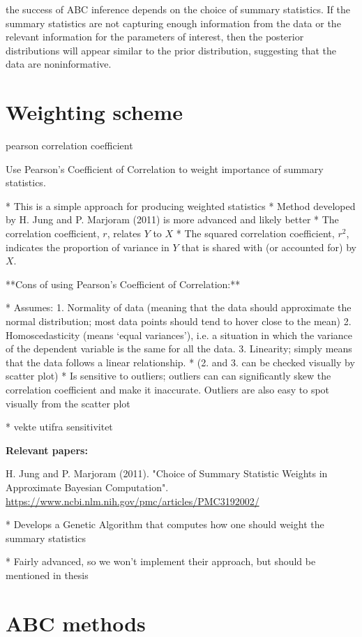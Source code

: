 the success of ABC inference depends on the choice of summary statistics. If the summary statistics are not capturing enough information from the data or the relevant information for the parameters of interest, then the posterior distributions will appear similar to the prior distribution, suggesting that the data are noninformative. 


\section{Weighting scheme}

pearson correlation coefficient

Use Pearson's Coefficient of Correlation to weight importance of summary statistics.

* This is a simple approach for producing weighted statistics 
    * Method developed by H. Jung and P. Marjoram (2011) is more advanced and likely better
* The correlation coefficient, $r$, relates $Y$ to $X$ 
* The squared correlation coefficient, $r^2$, indicates the proportion of variance in $Y$ that is shared with (or accounted for) by $X$.

**Cons of using Pearson's Coefficient of Correlation:**

* Assumes:
    1. Normality of data (meaning that the data should approximate the normal distribution; most data points should tend to hover close to the mean)
    2. Homoscedasticity (means ‘equal variances’), i.e. a situation in which the variance of the dependent variable is the same for all the data.
    3. Linearity; simply means that the data follows a linear relationship. 
* (2. and 3. can be checked visually by scatter plot)
* Is sensitive to outliers; outliers can can significantly skew the correlation coefficient and make it inaccurate. Outliers are also easy to spot visually from the scatter plot

* vekte utifra sensitivitet

\textbf{Relevant papers:}

H. Jung and P. Marjoram (2011). "Choice of Summary Statistic Weights in Approximate Bayesian Computation". \url{https://www.ncbi.nlm.nih.gov/pmc/articles/PMC3192002/}

* Develops a Genetic Algorithm that computes how one should weight the summary statistics 

* Fairly advanced, so we won't implement their approach, but should be mentioned in thesis

\section{ABC methods}

